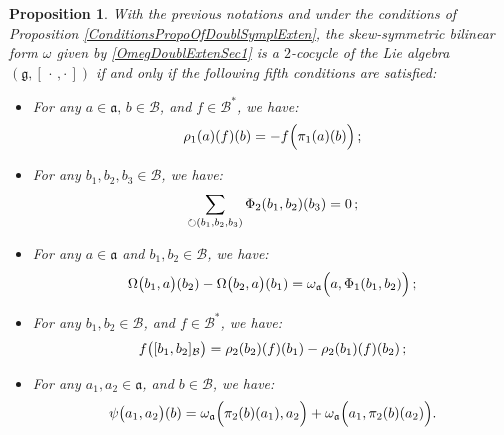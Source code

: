 \documentclass[final,1p,times,nopreprintline]{elsarticle}
\newtheorem{proposition}{Proposition}[section]
\theoremstyle{definition}
\numberwithin{equation}{section}
\newcommand{\w}{\omega}
\newcommand{\g}{\mathfrak{g}}
\newcommand{\ai}{\mathfrak{a}}
\numberwithin{equation}{section}
\newcommand{\cro}{[\,\cdot\,,\cdot\,]}
\newcommand{\bi}{\mathcal{B}}
\begin{document}
\begin{proposition}\label{OmegaIsSymplecticGMP}
With the previous notations and under the conditions of Proposition \ref{ConditionsPropoOfDoublSymplExten}, the skew-symmetric bilinear form $\w$ given by \eqref{OmegDoublExtenSec1} is a $2$-cocycle of the Lie algebra $(\g,\cro)$ if and only if
the following fifth conditions are satisfied:
\begin{itemize}
	\item[$(\textnormal{C$1$'})$] For any $a\in\ai,\,b\in\bi$, and $f\in\bi^*$, we have:\vspace{1mm}
	\begin{equation*}
		\rho_1(a)(f)(b)=-f\Big(\pi_1(a)(b)\Big)\,;\vspace{1mm}
	\end{equation*}
	\item[$(\textnormal{C$2$'})$] For any $b_1,b_2,b_3\in\bi$, we have:\vspace{1mm}
	\begin{equation*}
	\sum_{\circlearrowright (b_1,b_2,b_3)} \Phi_2(b_1,b_2)(b_3)=0\,;\vspace{1mm}
	\end{equation*}
	\item[$(\textnormal{C$3$'})$] For any $a\in\ai$ and $b_1,b_2\in\bi$, we have:\vspace{1mm}
	\begin{equation*}
		\Omega\big(b_1,a\big)(b_2)-\Omega\big(b_2,a\big)(b_1)=\w_\ai\Big(a,\Phi_1(b_1,b_2)\Big)\,;\vspace{1mm}
	\end{equation*}
	\item[$(\textnormal{C$4$'})$] For any $b_1,b_2\in\bi$, and $f\in\bi^*$, we have:\vspace{1mm}
	\begin{equation*}
		f\big([b_1,b_2]_\bi\big)=\rho_2(b_2)(f)(b_1)-\rho_2(b_1)(f)(b_2)\,;\vspace{1mm}
	\end{equation*}
	\item[$(\textnormal{C$5$'})$] For any $a_1,a_2\in\ai$, and $b\in\bi$, we have:\vspace{1mm}
	\begin{equation*}
	\psi\big(a_1,a_2\big)(b)=\w_\ai\Big(\pi_2(b)(a_1),a_2\Big)+\w_\ai\Big(a_1,\pi_2(b)(a_2)\Big).\vspace{1mm}
	\end{equation*}
\end{itemize}
\end{proposition}
\end{document}
